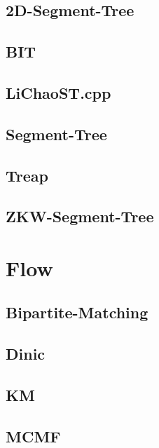 \documentclass[a4paper,10pt,twocolumn,oneside]{article}
\begin{document}
\subsection{2D-Segment-Tree}


\subsection{BIT}


\subsection{LiChaoST.cpp}


\subsection{Segment-Tree}


\subsection{Treap}


\subsection{ZKW-Segment-Tree}


\section{Flow}
\subsection{Bipartite-Matching}


\subsection{Dinic}


\subsection{KM}


\subsection{MCMF}

\end{document}
